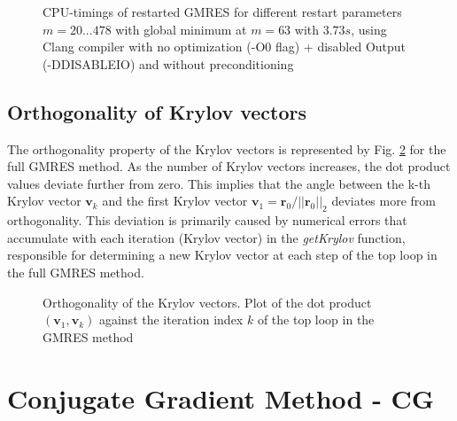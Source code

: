\documentclass[11pt,a4paper]{article}
\newcommand{\refFig}[1]{Fig. \ref{#1}}
\begin{document}
%
\begin{figure}[!htbp]
	\centering
	\hspace*{0.8cm}
	\leavevmode
	\resizebox{1.0\width}{!}{}
	\caption{CPU-timings of restarted GMRES for different restart parameters $m = {20...478} $ with global minimum at $m = 63$ with $3.73 s$, using Clang compiler with no optimization (-O0 flag) + disabled Output (-DDISABLEIO) and without preconditioning}
	\label{fig::Timings}
\end{figure}
%
\subsection{Orthogonality of Krylov vectors}
The orthogonality property of the Krylov vectors is represented by \refFig{fig::DotP} for the full GMRES method. As the number of Krylov vectors increases, the dot product values deviate further from zero. This implies that the angle between the k-th Krylov vector $\mathbf{v}_k$ and the first Krylov vector $\mathbf{v}_1 = \mathbf{r}_0 / ||\mathbf{r}_0||_2$ deviates more from orthogonality. This deviation is primarily caused by numerical errors that accumulate with each iteration (Krylov vector) in the \textit{getKrylov} function, responsible for determining a new Krylov vector at each step of the top loop in the full GMRES method.
%
\begin{figure}[!htbp]
	\centering
	\hspace*{0.8cm}
	\leavevmode
	\resizebox{0.9\width}{!}{}
	\caption{Orthogonality of the Krylov vectors. Plot of the dot product $(\mathbf{v}_1, \mathbf{v}_k)$ against the iteration index $k$ of the top loop in the GMRES method}
	\label{fig::DotP}
\end{figure}
%
\newpage
\section{Conjugate Gradient Method - CG}
\label{chapter:CG}
\end{document}
